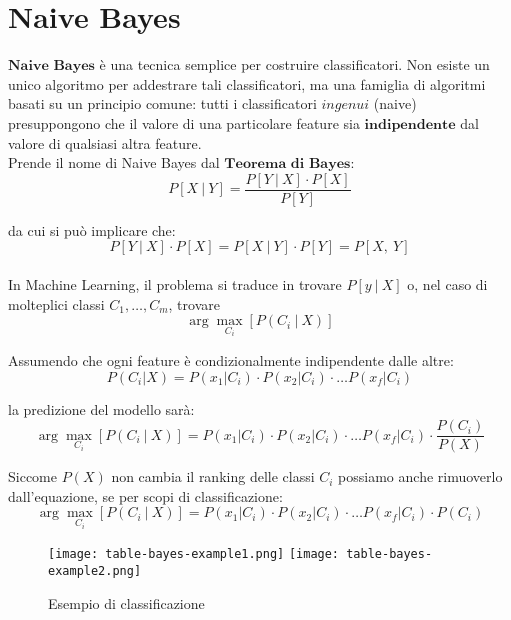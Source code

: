 \section{Naive Bayes}
    $\textbf{Naive Bayes}$ è una tecnica semplice per costruire classificatori.
    Non esiste un unico algoritmo per addestrare tali classificatori, ma una famiglia di algoritmi basati su un principio comune: tutti i classificatori $\textit{ingenui}$ (naive) presuppongono che
    il valore di una particolare feature sia $\textbf{indipendente}$ dal valore di qualsiasi altra feature.
    \\[1\baselineskip]
    Prende il nome di Naive Bayes dal $\textbf{Teorema di Bayes}$:
        $$ P \left[ X\ |\ Y \right] = \frac{P \left[ Y\ |\ X \right] \cdot P \left[ X \right]}{P \left[ Y \right]} $$
    
    da cui si può implicare che:
        $$ P \left[ Y\ |\ X \right] \cdot P \left[ X \right] = P \left[ X\ |\ Y \right] \cdot P \left[ Y \right] = P \left[ X,\ Y \right] $$
    \\[1\baselineskip]
    In Machine Learning, il problema si traduce in trovare $P \left[ y\ |\ X \right]$ o, nel caso di molteplici classi $C_{1}, \dots, C_{m}$, trovare
        $$ \arg \max_{C_i} \left[ P \left( C_{i}\ |\ X \right) \right] $$

    Assumendo che ogni feature è condizionalmente indipendente dalle altre:
        $$ P(C_i |X) = P(x_1 | C_i) \cdot P(x_2 | C_i) \cdot \ldots P(x_f | C_i) $$
    
    la predizione del modello sarà:
        $$ \arg \max_{C_i} \left[ P \left( C_{i}\ |\ X \right) \right] = P(x_1 | C_i) \cdot P(x_2 | C_i) \cdot \ldots P(x_f | C_i) \cdot \frac{P(C_i)}{P(X)} $$

    Siccome $P \left( X \right)$ non cambia il ranking delle classi $C_{i}$ possiamo anche rimuoverlo dall'equazione, se per scopi di classificazione:
        $$ \arg \max_{C_i} \left[ P \left( C_{i}\ |\ X \right) \right] = P(x_1 | C_i) \cdot P(x_2 | C_i) \cdot \ldots P(x_f | C_i) \cdot P(C_i) $$

    \clearpage

    \begin{figure}[h]
        \caption[short]{Esempio di classificazione}
        \centering
        \texttt{[image: table-bayes-example1.png]}
        \texttt{[image: table-bayes-example2.png]}
    \end{figure}

    \clearpage


